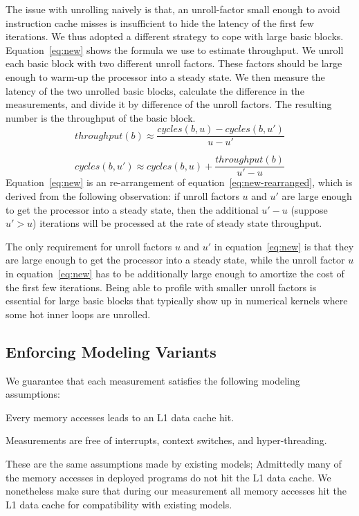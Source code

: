 The issue with unrolling naively is that,
an unroll-factor small enough to 
avoid instruction cache misses is 
insufficient to hide the latency of the first few iterations.
We thus adopted a different strategy to cope with large basic blocks.
Equation~\ref{eq:new} shows the formula we use to estimate throughput.
We unroll each basic block with two different unroll factors.
These factors should be large enough 
to warm-up the processor into a steady state.
We then measure the latency of the two unrolled basic blocks,
calculate the difference in the measurements, and divide it 
by difference of the unroll factors.
The resulting number is the throughput of the basic block.
\begin{equation}
\mathit{throughput}(b) \approx 
\frac{\mathit{cycles}(b, u) - \mathit{cycles}(b, u')}{u-u'}
\label{eq:new}
\end{equation}

\begin{equation}
\mathit{cycles}(b, u') \approx 
\mathit{cycles}(b, u) + \frac{\mathit{throughput(b)}}{u'-u}
\label{eq:new-rearranged}
\end{equation}
Equation~\ref{eq:new} is an re-arrangement of equation~\ref{eq:new-rearranged},
which is derived from the following observation:
if unroll factors $u$ and $u'$ are large enough
to get the processor into a steady state,
then the additional $u'-u$ (suppose $u' > u$) iterations will be processed at 
the rate of steady state throughput.

The only requirement for unroll factors $u$ and $u'$ in equation~\ref{eq:new}
is that they are large enough to get the processor into a steady state,
while the unroll factor $u$ in equation~\ref{eq:new} has to be additionally
large enough to amortize the cost of the first few iterations.
Being able to profile with smaller unroll factors is essential
for large basic blocks that typically show up in numerical kernels where
some hot inner loops are unrolled.


\subsection{Enforcing Modeling Variants}\label{sec:invariants}
We guarantee that each measurement satisfies the following modeling assumptions:
\begin{enumerate*}
    \item Every memory accesses leads to an L1 data cache hit. 
    \item Measurements are free of interrupts, context switches,
    and hyper-threading.
\end{enumerate*}
These are the same assumptions made by existing models;
Admittedly many of the memory accesses in deployed programs do not hit the L1 data cache.
We nonetheless make sure that during our measurement all memory accesses hit the L1 data cache for compatibility with existing models.

